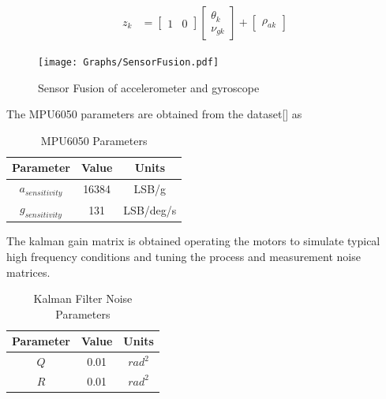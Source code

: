         \begin{equation}
            \begin{aligned}
                z_k &= \begin{bmatrix}
                    1 & 0
                \end{bmatrix}
                \begin{bmatrix}
                    \theta_k \\
                    \nu_{g{k}}
                \end{bmatrix}
                + \begin{bmatrix}
                    \rho_{a{k}}
                \end{bmatrix}
            \end{aligned}
            \label{eq:gyroBias2}
        \end{equation}
        

        \begin{figure}[H]
            \centering
            \texttt{[image: Graphs/SensorFusion.pdf]}
            \caption{Sensor Fusion of accelerometer and gyroscope}
            \label{fig:SensorFusion}
        \end{figure}

        The MPU6050 parameters are obtained from the dataset[] as 
        \begin{table}[H]
            \centering
            \begin{tabular}{|c|c|c|}
                \hline
                Parameter & Value & Units \\
                \hline
                $a_{sensitivity}$ & 16384 & LSB/g \\
                $g_{sensitivity}$ & 131 & LSB/deg/s \\
                \hline
            \end{tabular}
            \caption{MPU6050 Parameters}
        \end{table}
        The kalman gain matrix is obtained operating the motors to simulate typical high frequency conditions 
        and tuning the process and measurement noise matrices.
        \begin{table}[H]
            \centering
            \begin{tabular}{|c|c|c|}
                \hline
                Parameter & Value & Units \\
                \hline
                $Q$ & 0.01 & $rad^2$ \\
                $R$ & 0.01 & $rad^2$ \\
                \hline
            \end{tabular}
            \caption{Kalman Filter Noise Parameters}
        \end{table}

